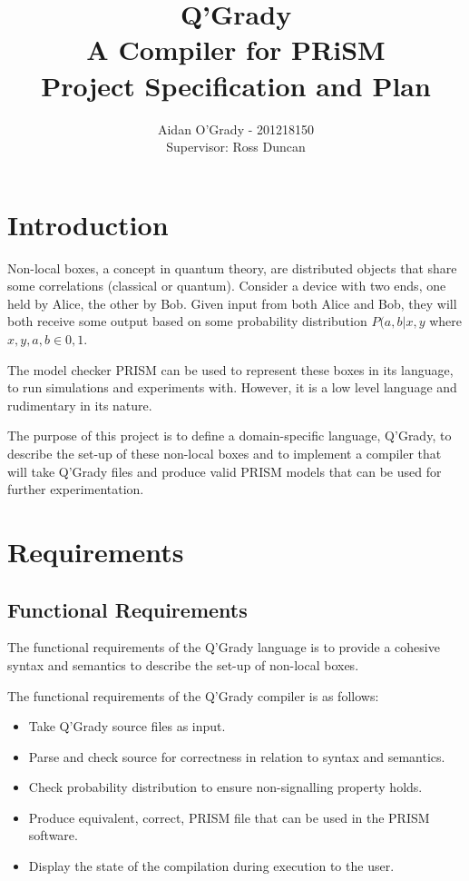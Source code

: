 \documentclass[11pt, a4paper]{article}
\begin{document}
\title{Q'Grady \\A Compiler for PRiSM \\
\large{Project Specification and Plan}}
\author{Aidan O'Grady - 201218150\\Supervisor: Ross Duncan}
\date{}
\maketitle

\section{Introduction} %
\label{sec:introduction}
Non-local boxes, a concept in quantum theory, are distributed objects that share
some correlations (classical or quantum). Consider a device with two ends, one
held by Alice, the other by Bob. Given input from both Alice and Bob, they will
both receive some output based on some probability distribution \(P(a,b|x,y\)
where \(x,y,a,b \in {0,1}\).

The model checker PRISM can be used to represent these boxes in its language,
to run simulations and experiments with. However, it is a low level language and
rudimentary in its nature.

The purpose of this project is to define a domain-specific language, Q'Grady, to
describe the set-up of these non-local boxes and to implement a compiler that
will take Q'Grady files and produce valid PRISM models that can be used for
further experimentation.


\section{Requirements} %
\label{sec:requirements}
\subsection{Functional Requirements} %
\label{sub:functional_requirements}
The functional requirements of the Q'Grady language is to provide a cohesive
syntax and semantics to describe the set-up of non-local boxes.

The functional requirements of the Q'Grady compiler is as follows:
\begin{itemize}
    \item Take Q'Grady source files as input.
    \item Parse and check source for correctness in relation to syntax and
    semantics.
    \item Check probability distribution to ensure non-signalling property
    holds.
    \item Produce equivalent, correct, PRISM file that can be used in the PRISM
    software.
    \item Display the state of the compilation during execution to the user.
\end{itemize}
\end{document}
